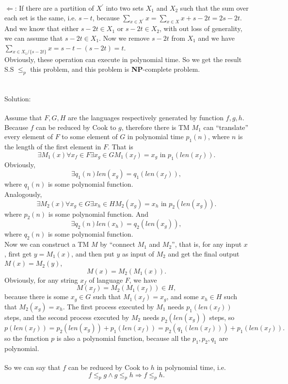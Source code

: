 \documentclass[a4papper]{article}
\theoremstyle{neosn}
\begin{document}
    $\Leftarrow$: If there are a partition of $X^{\prime}$ into two sets $X_1$ and $X_2$ such that the sum over each
    set is the same, i.e. $s-t$, because $\sum_{x \in X^{\prime}}x = \sum_{x \in X} x + s-2t = 2s-2t$.
    And we know that either $s-2t \in X_1$ or $s-2t \in X_2$, with out loss of generality, we can assume
    that $s-2t \in X_1$.
    Now we remove $s-2t$ from $X_1$ and we have $\sum_{x \in X_1 \slash \{s-2t\}}x = s-t - (s-2t) = t$.\\

    Obviously, these operation can execute in polynomial time.
    So we get the result S.S $\leqslant_p$ this problem, and this problem is \textbf{NP}-complete problem. \\

    \\

     \\

    Solution: \\
    \\
    Assume that $F, G, H$ are the languages respectively generated by function $f, g, h$.
    Because $f$ can be reduced by Cook to $g$, therefore there is TM $M_1$ can ``translate'' every
    element of $F$ to some element of $G$ in polynomial time $p_1(n)$, where $n$ is the length of
    the first element in $F$.
    That is
    \[
        \exists M_1(x) \forall x_f \in F \exists x_g \in G M_1(x_f) = x_g \text{ in }p_1(len(x_f)).
    \]
    Obviously,
    \[
        \exists q_1(n) len(x_g) = q_1(len(x_f)),
    \]
    where $q_1(n)$ is some polynomial function. \\

    Analogously,
    \[
        \exists M_2(x) \forall x_g \in G \exists x_h \in H M_2(x_g) = x_h \text{ in }p_2(len(x_g)).
    \]
    where $p_2(n)$ is some polynomial function.
    And
    \[
        \exists q_2(n) len(x_h) = q_2(len(x_g)),
    \]
    where $q_2(n)$ is some polynomial function. \\

    Now we can construct a TM $M$ by ``connect $M_1$ and $M_2$'', that is, for any input $x$, first
    get $y = M_1(x)$, and then put $y$ as input of $M_2$ and get the final output $M(x) = M_2(y)$,
    \[
        M(x) = M_2(M_1(x)).
    \]
    Obviously, for any string $x_f$ of language $F$, we have
    \[
        M(x_f) = M_2(M_1(x_f)) \in H,
    \]
    because there is some $x_g \in G$ such that $M_1(x_f) = x_g$, and some $x_h \in H$ such that
    $M_2(x_g) = x_h$.
    The first process executed by $M_1$ needs $p_1(len(x_f))$ steps, and the second process
    executed by $M_2$ needs $p_2(len(x_g))$ steps, so
    \[
        p(len(x_f)) = p_2(len(x_g)) + p_1(len(x_f)) = p_2(q_1(len(x_f))) + p_1(len(x_f)).
    \]
    so the function $p$ is also a polynomial function, because all the $p_1, p_2, q_1$ are polynomial.\\

    \\
    So we can say that $f$ can be reduced by Cook to $h$ in polynomial time, i.e.
    \[
        f \leqslant_p g \land g\leqslant_p h \Rightarrow f \leqslant_p h.
    \]
\end{document}

